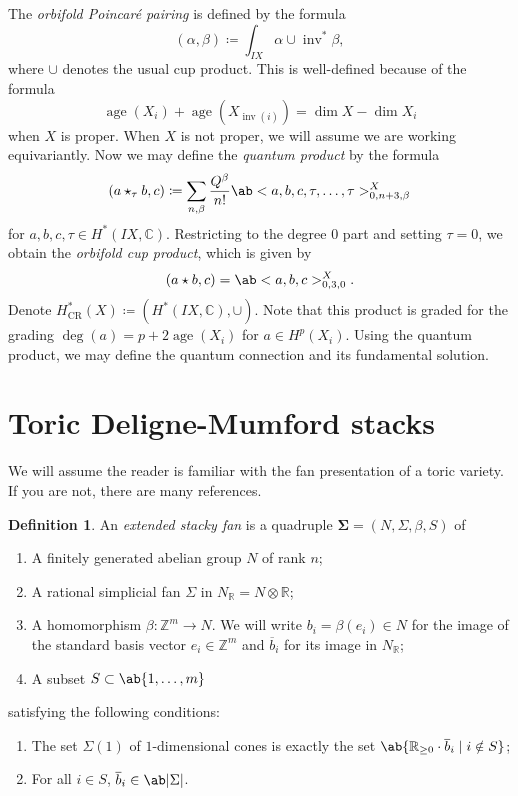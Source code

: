 \documentclass{amsart}
\theoremstyle{definition}
\newtheorem{defn}[thm]{Definition}
\theoremstyle{remark}
\theoremstyle{plain}
\theoremstyle{definition}
\theoremstyle{remark}
\newcommand{\R}{\mathbb{R}}
\newcommand{\C}{\mathbb{C}}
\newcommand{\Z}{\mathbb{Z}}
\newcommand{\mr}[1]{\mathrm{#1}}
\newcommand{\on}[1]{\operatorname{#1}}
\newcommand{\ol}[1]{\overline{#1}}
\newcommand{\1}{\mathbf{1}}
\newcommand{\2}{\mathbf{2}}
\newcommand{\3}{\mathbf{3}}
\begin{document}
The \textit{orbifold Poincar\'e pairing} is defined by the formula
\[ (\alpha,\beta) \coloneqq \int_{IX} \alpha \cup \on{inv}^* \beta, \]
where $\cup$ denotes the usual cup product. This is well-defined because of the formula
\[ \on{age}(X_i) + \on{age}(X_{\on{inv}(i)}) = \dim X - \dim X_i \]
when $X$ is proper. When $X$ is not proper, we will assume we are working equivariantly.
Now we may define the \textit{quantum product} by the formula
\[ (a \star_{\tau} b, c) \coloneqq \sum_{n,\beta} \frac{Q^{\beta}}{n!} \ab<a,b,c,\tau,\ldots,\tau>_{0,n+3,\beta}^X \]
for $a,b,c,\tau \in H^*(IX, \C)$. Restricting to the degree $0$ part and setting $\tau = 0$, we obtain the \textit{orbifold cup product}, which is given by
\[ (a \star b, c) = \ab<a,b,c>_{0,3,0}^X. \]
Denote $H^*_{\mr{CR}}(X) \coloneqq (H^*(IX, \C), \cup)$. Note that this product is graded for the grading $\deg(a) = p + 2 \on{age}(X_i)$ for $a \in H^p(X_i)$. Using the quantum product, we may define the quantum connection and its fundamental solution.

\section{Toric Deligne-Mumford stacks}%
\label{sec:Toric Deligne-Mumford stacks}

We will assume the reader is familiar with the fan presentation of a toric variety. If you are not, there are many references.

\begin{defn}
    An \textit{extended stacky fan} is a quadruple $\bm{\Sigma} = (N, \Sigma, \beta, S)$ of
    \begin{enumerate}
        \item A finitely generated abelian group $N$ of rank $n$;
        \item A rational simplicial fan $\Sigma$ in $N_{\R} = N \otimes \R$;
        \item A homomorphism $\beta \colon \Z^m \to N$. We will write $b_i = \beta(e_i) \in N$ for the image of the standard basis vector $e_i \in \Z^m$ and $\ol{b}_i$ for its image in $N_{\R}$;
        \item A subset $S \subset \ab\{1,\ldots,m\}$
    \end{enumerate}
    satisfying the following conditions:
    \begin{enumerate}
        \item The set $\Sigma(1)$ of $1$-dimensional cones is exactly the set $\ab\{\R_{\geq 0} \cdot \ol{b}_i \mid i \notin S \}$;
        \item For all $i \in S$, $\ol{b}_i \in \ab|\Sigma|$.
    \end{enumerate}
\end{defn}
\end{document}
